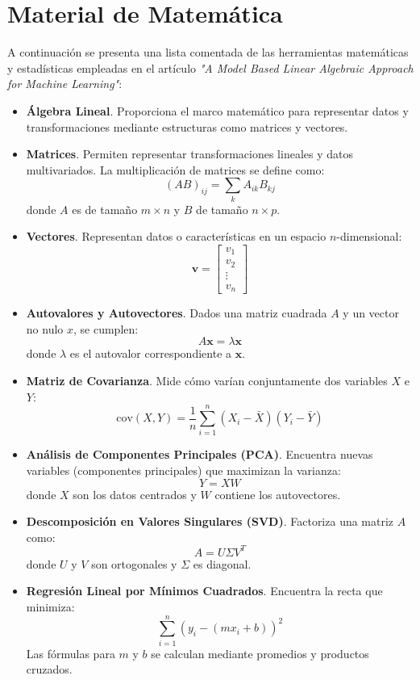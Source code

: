 \documentclass[12pt]{article}
\begin{document}
	\newpage
	\section{Material de Matemática}



\noindent
A continuación se presenta una lista comentada de las herramientas matemáticas y estadísticas empleadas en el artículo \emph{"A Model Based Linear Algebraic Approach for Machine Learning"}:

\begin{itemize}
	\item \textbf{Álgebra Lineal}. Proporciona el marco matemático para representar datos y transformaciones mediante estructuras como matrices y vectores.
	
	\item \textbf{Matrices}. Permiten representar transformaciones lineales y datos multivariados. La multiplicación de matrices se define como:
	\[
	(AB)_{ij} = \sum_k A_{ik} B_{kj}
	\]
	donde $A$ es de tamaño $m \times n$ y $B$ de tamaño $n \times p$.
	
	\item \textbf{Vectores}. Representan datos o características en un espacio $n$-dimensional:
	\[
	\mathbf{v} = \begin{bmatrix} v_1 \\ v_2 \\ \vdots \\ v_n \end{bmatrix}
	\]
	
	\item \textbf{Autovalores y Autovectores}. Dados una matriz cuadrada $A$ y un vector no nulo $x$, se cumplen:
	\[
	A \mathbf{x} = \lambda \mathbf{x}
	\]
	donde $\lambda$ es el autovalor correspondiente a $\mathbf{x}$.
	
	\item \textbf{Matriz de Covarianza}. Mide cómo varían conjuntamente dos variables $X$ e $Y$:
	\[
	\text{cov}(X, Y) = \frac{1}{n} \sum_{i=1}^n (X_i - \bar{X})(Y_i - \bar{Y})
	\]
	
	\item \textbf{Análisis de Componentes Principales (PCA)}. Encuentra nuevas variables (componentes principales) que maximizan la varianza:
	\[
	Y = X W
	\]
	donde $X$ son los datos centrados y $W$ contiene los autovectores.
	
	\item \textbf{Descomposición en Valores Singulares (SVD)}. Factoriza una matriz $A$ como:
	\[
	A = U \Sigma V^T
	\]
	donde $U$ y $V$ son ortogonales y $\Sigma$ es diagonal.
	
	\item \textbf{Regresión Lineal por Mínimos Cuadrados}. Encuentra la recta que minimiza:
	\[
	\sum_{i=1}^n (y_i - (m x_i + b))^2
	\]
	Las fórmulas para $m$ y $b$ se calculan mediante promedios y productos cruzados.
\end{itemize}
\end{document}
